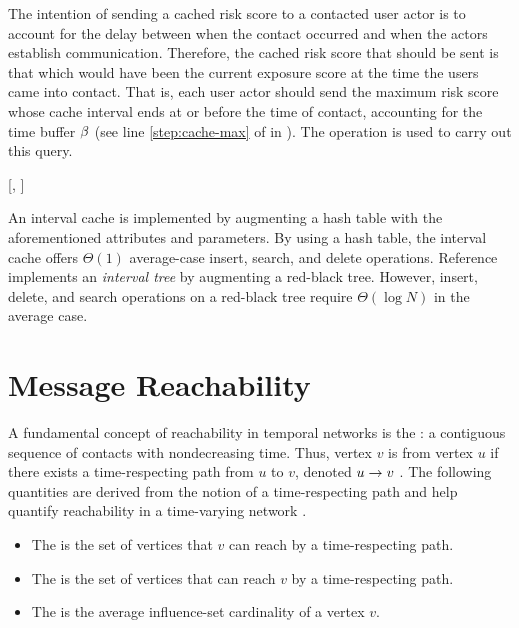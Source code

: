 The intention of sending a cached risk score to a contacted user actor is to account for the delay between when the contact occurred and when the actors establish communication. Therefore, the cached risk score that should be sent is that which would have been the current exposure score at the time the users came into contact. That is, each user actor should send the maximum risk score whose cache interval ends at or before the time of contact, accounting for the time buffer $\beta$ (see line \ref{step:cache-max} of \cSendCurrentOrCached in ). The operation \cCacheMax is used to carry out this query.
%
\begin{function}{\nCacheMax}[\vCache, \vTime]
    \mReturn{\cMaximum[\{\vCacheItem \in \vCache \mid \aCacheItemKey < \cCacheKey[\vTime]\}]}
\end{function}

An interval cache is implemented by augmenting a hash table \cite[pp. 253--285]{Cormen2009} with the aforementioned attributes and parameters. By using a hash table, the interval cache offers $\Theta(1)$ average-case insert, search, and delete operations. Reference \cite[pp. 348--354]{Cormen2009} implements an \emph{interval tree} by augmenting a red-black tree. However, insert, delete, and search operations on a red-black tree require $\Theta(\log N)$ in the average case.

\section{Message Reachability}\label{sec:reachability}
A fundamental concept of reachability in temporal networks is the : a contiguous sequence of contacts with nondecreasing time. Thus, vertex $v$ is  from vertex $u$ if there exists a time-respecting path from $u$ to $v$, denoted $u \rightarrow v$ \cite{Moody2002}. The following quantities are derived from the notion of a time-respecting path and help quantify reachability in a time-varying network \cite{Holme2012}.
%
\begin{itemize}
   \item The  is the set of vertices that $v$ can reach by a time-respecting path.
	\item The  is the set of vertices that can reach $v$ by a time-respecting path.
	\item The  is the average influence-set cardinality of a vertex $v$.
\end{itemize}

